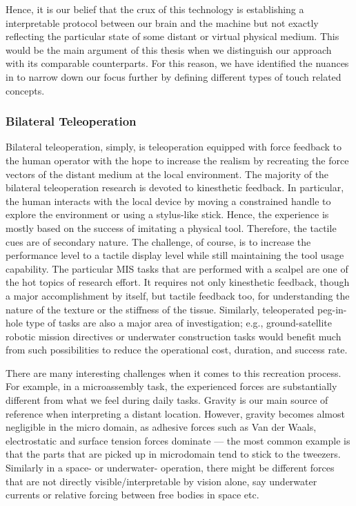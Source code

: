 Hence, it is our belief that the crux of this technology is establishing a interpretable protocol between our brain and the machine but 
not exactly reflecting the particular state of some distant or virtual physical medium. 
This would be the main argument of this thesis when we distinguish our approach with its comparable counterparts. For this reason, we 
have identified the nuances in  to narrow down our focus further by defining different types of touch related 
concepts.



\subsubsection{Bilateral Teleoperation}

Bilateral teleoperation, simply, is teleoperation equipped with force feedback to the human operator with the hope to increase the realism 
by recreating the force vectors of the distant medium at the local environment. The majority of the bilateral teleoperation research is 
devoted to kinesthetic feedback. In particular, the human interacts with the local device by moving a constrained handle to explore the 
environment or using a stylus-like stick. Hence, the experience is mostly based on the success of imitating a physical tool. Therefore, 
the tactile cues are of secondary nature. The challenge, of course, is to increase the performance level to a tactile display level while 
still maintaining the tool usage capability. The particular MIS tasks that are performed with a scalpel are one of the hot topics of 
research effort. It requires not only kinesthetic feedback, though a major accomplishment by itself, but tactile feedback too, for 
understanding the nature of the texture or the stiffness of the tissue. Similarly, teleoperated peg-in-hole type of tasks are also a major 
area of investigation; e.g., ground-satellite robotic mission directives or underwater construction tasks would benefit much from such 
possibilities to reduce the operational cost, duration, and success rate. 



There are many interesting challenges when it comes to this recreation process. For example, in a microassembly task, the experienced 
forces are substantially different from what we feel during daily tasks. Gravity is our main source of reference when interpreting a 
distant location. However, gravity becomes almost negligible in the micro domain, as adhesive forces such as Van der Waals, electrostatic 
and surface tension forces dominate --- the most common example is that the parts that are picked up in microdomain 
tend to stick to the tweezers. Similarly in a space- or underwater- operation, there might be different forces that are not directly 
visible/interpretable by vision alone, say underwater currents or relative forcing between free bodies in space etc.

